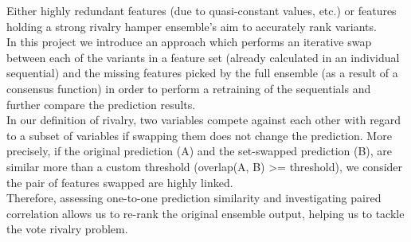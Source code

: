 Either highly redundant features (due to quasi-constant values, etc.) or features holding a strong rivalry hamper ensemble's aim to accurately rank variants.
\\

In this project we introduce an approach which performs an iterative swap between each of the variants in a feature set (already calculated in an individual sequential) and the missing features picked by the full ensemble (as a result of a consensus function) in order to perform a retraining of the sequentials and further compare the prediction results.
\\

In our definition of rivalry, two variables compete against each other with regard to a subset of variables if swapping them does not change the prediction.
More precisely, if the original prediction (A) and the set-swapped prediction (B), are similar more than a custom threshold (overlap(A, B) >= threshold), we consider the pair of features swapped are highly linked.
\\

Therefore, assessing one-to-one prediction similarity and investigating paired correlation allows us to re-rank the original ensemble output, helping us to tackle the vote rivalry problem.

